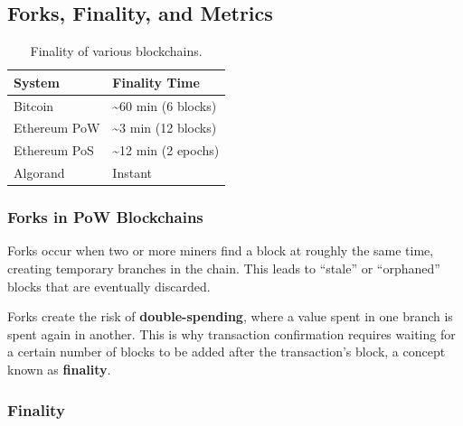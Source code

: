 \subsection{Forks, Finality, and
Metrics}\label{section-2-forks-finality-and-metrics}

\begin{table}[b]
	
	\begin{center}
		\begin{tabular}{ll}
			\toprule
			System & Finality Time \\
			\midrule
			Bitcoin & \textasciitilde60 min (6 blocks) \\
			Ethereum PoW & \textasciitilde3 min (12 blocks) \\
			Ethereum PoS & \textasciitilde12 min (2 epochs) \\
			Algorand & Instant \\
			\bottomrule
			
		\end{tabular}
	\end{center}
	\caption{Finality of various blockchains.}\label{tab:finality}
	
\end{table}


\subsubsection{Forks in PoW
Blockchains}\label{forks-in-pow-blockchains}

Forks occur when two or more miners find a block at roughly the same
time, creating temporary branches in the chain. This leads to ``stale''
or ``orphaned'' blocks that are eventually discarded.


Forks create the risk of \textbf{double-spending}, where a value spent
in one branch is spent again in another. This is why transaction
confirmation requires waiting for a certain number of blocks to be added
after the transaction's block, a concept known as \textbf{finality}.

\subsubsection{Finality}\label{finality}

